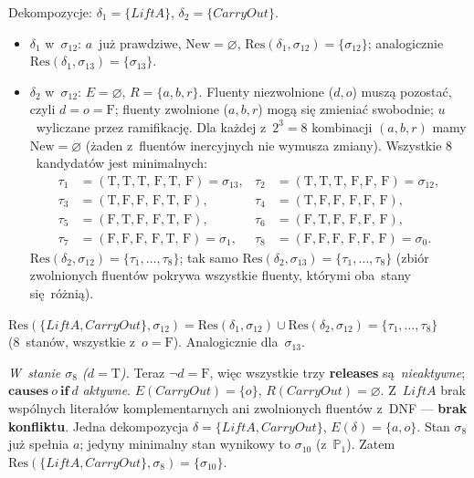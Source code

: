 \documentclass[11pt,a4paper]{article}
\newcommand{\causes}{\textbf{causes}}
\renewcommand{\iff}{\textbf{if}}
\newcommand{\releases}{\textbf{releases}}
\theoremstyle{definition}
\begin{document}
\smallskip\noindent
Dekompozycje: $\delta_1 = \{\mathit{LiftA}\}$, $\delta_2 = \{\mathit{CarryOut}\}$.
\begin{itemize}[topsep=2pt]
  \item $\delta_1$ w~$\sigma_{12}$: $a$~już prawdziwe, $\mathrm{New} = \varnothing$,
        $\mathrm{Res}(\delta_1, \sigma_{12}) = \{\sigma_{12}\}$; analogicznie
        $\mathrm{Res}(\delta_1, \sigma_{13}) = \{\sigma_{13}\}$.
  \item $\delta_2$ w~$\sigma_{12}$: $E = \varnothing$, $R = \{a, b, r\}$.
        Fluenty niezwolnione ($d, o$) muszą pozostać, czyli $d = o = \text{F}$;
        fluenty zwolnione ($a, b, r$) mogą się zmieniać swobodnie; $u$~wyliczane
        przez ramifikację. Dla każdej z~$2^3 = 8$ kombinacji $(a, b, r)$
        mamy $\mathrm{New} = \varnothing$ (żaden z~fluentów inercyjnych
        nie wymusza zmiany). Wszystkie $8$~kandydatów jest minimalnych:
        \begin{align*}
          \tau_1 &= (\text{T},\text{T},\text{T},\,\text{F},\text{T},\,\text{F}) = \sigma_{13}, &
          \tau_2 &= (\text{T},\text{T},\text{T},\,\text{F},\text{F},\,\text{F}) = \sigma_{12}, \\
          \tau_3 &= (\text{T},\text{F},\text{F},\,\text{F},\text{T},\,\text{F}), &
          \tau_4 &= (\text{T},\text{F},\text{F},\,\text{F},\text{F},\,\text{F}), \\
          \tau_5 &= (\text{F},\text{T},\text{F},\,\text{F},\text{T},\,\text{F}), &
          \tau_6 &= (\text{F},\text{T},\text{F},\,\text{F},\text{F},\,\text{F}), \\
          \tau_7 &= (\text{F},\text{F},\text{F},\,\text{F},\text{T},\,\text{F}) = \sigma_1, &
          \tau_8 &= (\text{F},\text{F},\text{F},\,\text{F},\text{F},\,\text{F}) = \sigma_0.
        \end{align*}
        $\mathrm{Res}(\delta_2, \sigma_{12}) = \{\tau_1, \ldots, \tau_8\}$;
        tak samo $\mathrm{Res}(\delta_2, \sigma_{13}) = \{\tau_1, \ldots, \tau_8\}$
        (zbiór zwolnionych fluentów pokrywa wszystkie fluenty, którymi oba~stany
        się~różnią).
\end{itemize}
$\mathrm{Res}(\{\mathit{LiftA}, \mathit{CarryOut}\}, \sigma_{12}) =
\mathrm{Res}(\delta_1, \sigma_{12}) \cup \mathrm{Res}(\delta_2, \sigma_{12})
= \{\tau_1, \ldots, \tau_8\}$ (8~stanów, wszystkie z~$o = \text{F}$).
Analogicznie dla~$\sigma_{13}$.

\smallskip\noindent
\emph{W~stanie $\sigma_8$ ($d = \text{T}$).}
Teraz $\neg d = \text{F}$, więc wszystkie trzy \releases{} są~\emph{nieaktywne};
$\causes\ o\ \iff\ d$ \emph{aktywne}. $E(\mathit{CarryOut}) = \{o\}$,
$R(\mathit{CarryOut}) = \varnothing$. Z~$\mathit{LiftA}$ brak wspólnych literałów
komplementarnych ani zwolnionych fluentów z~DNF --- \textbf{brak konfliktu}.
Jedna dekompozycja $\delta = \{\mathit{LiftA}, \mathit{CarryOut}\}$,
$E(\delta) = \{a, o\}$. Stan $\sigma_8$ już spełnia $a$; jedyny minimalny stan
wynikowy to $\sigma_{10}$ (z~$\mathbb{P}_1$). Zatem
$\mathrm{Res}(\{\mathit{LiftA}, \mathit{CarryOut}\}, \sigma_8) = \{\sigma_{10}\}$.
\end{document}
